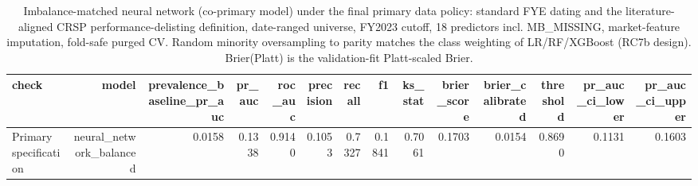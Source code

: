 \begin{table}[htbp]
\centering
\caption{Imbalance-matched neural network (co-primary model) under the final primary data policy: standard FYE dating and the literature-aligned CRSP performance-delisting definition, date-ranged universe, FY2023 cutoff, 18 predictors incl. MB\_MISSING, market-feature imputation, fold-safe purged CV. Random minority oversampling to parity matches the class weighting of LR/RF/XGBoost (RC7b design). Brier(Platt) is the validation-fit Platt-scaled Brier.}
\label{tab:v2_nn_balanced}
\small
\begin{tabular}{lrrrrrrrrrrrrr}
\toprule
check & model & prevalence\_baseline\_pr\_auc & pr\_auc & roc\_auc & precision & recall & f1 & ks\_stat & brier\_score & brier\_calibrated & threshold & pr\_auc\_ci\_lower & pr\_auc\_ci\_upper \\
\midrule
Primary specification & neural\_network\_balanced & 0.0158 & 0.1338 & 0.9140 & 0.1053 & 0.7327 & 0.1841 & 0.7061 & 0.1703 & 0.0154 & 0.8690 & 0.1131 & 0.1603 \\
\bottomrule
\end{tabular}
\end{table}
